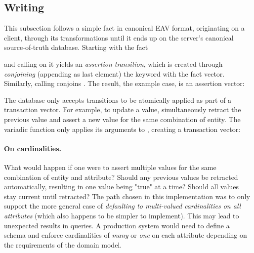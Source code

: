 \subsection{Writing}

This subsection follows a simple fact in canonical EAV format, originating on a client, through its transformations until it ends up on the server's canonical source-of-truth database. Starting with the fact

\begin{center}
\end{center}

and calling  on it yields an \emph{assertion transition}, which is created through \emph{conjoining} (appending as last element) the \lisp{:+} keyword with the fact vector. Similarly, calling  conjoins \lisp{:-}. The result, the example case, is an assertion vector:

\begin{center}
\end{center}

The database only accepts transitions to be atomically applied as part of a transaction vector. For example, to update a value, simultaneously retract the previous value and assert a new value for the same combination of entity. The variadic  function only applies its arguments to , creating a transaction vector:

\begin{center}
\end{center}

\paragraph{On cardinalities.} What would happen if one were to assert multiple values for the same combination of entity and attribute? Should any previous values be retracted automatically, resulting in one value being "true" at a time? Should all values stay current until retracted? The path chosen in this implementation was to only support the more general case of \emph{defaulting to multi-valued cardinalities on all attributes} (which also happens to be simpler to implement). This may lead to unexpected results in queries. A production system would need to define a schema and enforce cardinalities of \emph{many} or \emph{one} on each attribute depending on the requirements of the domain model.

